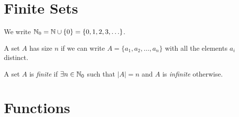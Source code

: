 \documentclass[../main.tex]{subfiles}
\begin{document}
\section{Finite Sets}
\begin{remark}[Notation]
We write $\mathbb{N}_0 = \mathbb{N} \cup \{0\} = \{0, 1, 2, 3, \ldots\}$.
\end{remark}
A set $A$ has size $n$ if we can write $A = \{a_1, a_2, \ldots, a_n\}$ with all the elements $a_i$ distinct.
\begin{definition}
  A set $A$ is \textit{finite} if $\exists n \in \mathbb{N}_0$ such that $|A| = n$ and $A$ is \textit{infinite} otherwise.
\end{definition}
\section{Functions}
\end{document}
